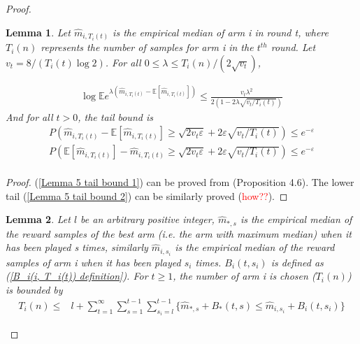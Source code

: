 \documentclass{article}
\theoremstyle{plain}
\newtheorem{lemma}{Lemma}
\begin{document}
\begin{proof}

\begin{lemma}
Let $\hat{m}_{i, T_i(t)}$ is the empirical median of arm i in round t, where $T_i(n)$ represents the number of samples for arm i in the $t^{th}$ round. Let $v_t = 8/(T_i(t) \log 2)$. For all $ 0 \leq \lambda \leq T_i(n)/(2 \sqrt{v_t})$,

\begin{align}
    \label{Boucheron propo 4.6}
    \log \mathbb{E} e^{\lambda\left(\hat{m}_{i, T_i(t)}-\mathbb{E}[ \hat{m}_{i, T_i(t)}]\right)} \leq \frac{v_t \lambda^2}{2(1-2\lambda \sqrt{v_t/T_i(t)})}
\end{align}
And for all $t > 0$, the tail bound is
\begin{align}
    \label{Lemma 5 tail bound 1}
   P\left( \hat{m}_{i, T_i(t)}-\mathbb{E}[ \hat{m}_{i, T_i(t)}] \geq \sqrt{2v_t \varepsilon} + 2 \varepsilon \sqrt{v_t/T_i(t)} \right) \leq e^{-\varepsilon}\\
   \label{Lemma 5 tail bound 2}
   P\left( \mathbb{E}[ \hat{m}_{i, T_i(t)}] - \hat{m}_{i, T_i(t)} \geq \sqrt{2v_t \varepsilon} + 2 \varepsilon \sqrt{v_t/T_i(t)} \right) \leq e^{-\varepsilon}\\
\end{align}
\end{lemma}

\begin{proof}
(\ref{Lemma 5 tail bound 1}) can be proved from \cite{boucheron2012}(Proposition 4.6). The lower tail (\ref{Lemma 5 tail bound 2}) can be similarly proved (\textcolor{red}{how??}).
\end{proof}

\begin{lemma}
Let $l$ be an arbitrary positive integer, $\hat{m}_{*, s}$ is the empirical median of the reward samples of the best arm (i.e. the arm with maximum median) when it has been played s times, similarly $\hat{m}_{i, s_i}$ is the empirical median of the reward samples of arm i when it has been played $s_i$ times. $B_i(t, s_i)$ is defined as (\ref{B_i(i, T_i(t)) definition}). For $t \geq 1$, the number of arm i is chosen ($T_i(n)$) is bounded by
\begin{align}
    T_i(n) \leq & l + \sum_{t = 1}^\infty \sum_{s = 1}^{t-1} \sum_{s_i = l}^{t-1} \{\hat{m}_{*, s} + B_*(t, s)  \leq \hat{m}_{i, s_i} + B_i(t, s_i)\}
\end{align}
\end{lemma}


\end{proof}
\end{document}
